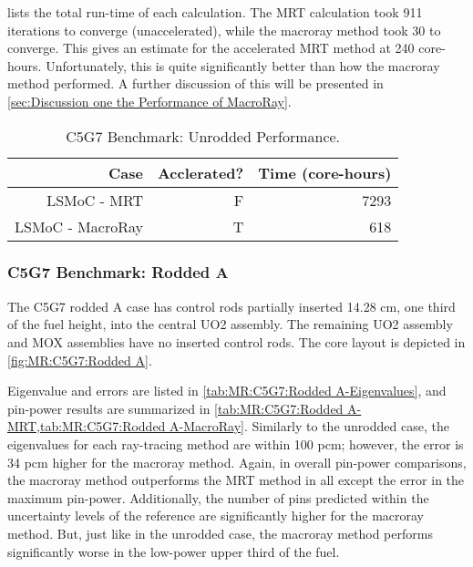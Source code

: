 {{{{         lists the total run-time of each calculation.
        The \ac{MRT} calculation took 911 iterations to converge (unaccelerated), while the macroray method took 30 to converge.
        This gives an estimate for the accelerated \ac{MRT} method at 240 core-hours.
        Unfortunately, this is quite significantly better than how the macroray method performed.
        A further discussion of this will be presented in \cref{sec:Discussion one the Performance of MacroRay}.

        \begin{table}[htbp]
          \centering
          \caption{C5G7 Benchmark: Unrodded Performance. \label{tab:MR:C5G7:Unrodded-Performance}}
          \begin{tabular}{rrr}\toprule
            Case                        & Acclerated? & Time (core-hours)\\\midrule
            LSMoC - MRT                 & F & 7293\\
            LSMoC - MacroRay            & T & 618\\\bottomrule
          \end{tabular}
        \end{table}
      }

      \subsubsection{C5G7 Benchmark: Rodded A}{\label{sssec:MR:C5G7:Rodded A}
        The C5G7 rodded A case has control rods partially inserted 14.28 cm, one third of the fuel height, into the central \ac{UO2} assembly.
        The remaining \ac{UO2} assembly and \ac{MOX} assemblies have no inserted control rods.
        The core layout is depicted in \cref{fig:MR:C5G7:Rodded A}.

        Eigenvalue and errors are listed in \cref{tab:MR:C5G7:Rodded A-Eigenvalues}, and pin-power results are summarized in \cref{tab:MR:C5G7:Rodded A-MRT,tab:MR:C5G7:Rodded A-MacroRay}.
        Similarly to the unrodded case, the eigenvalues for each ray-tracing method are within 100 pcm; however, the error is 34 pcm higher for the macroray method.
        Again, in overall pin-power comparisons, the macroray method outperforms the MRT method in all except the error in the maximum pin-power.
        Additionally, the number of pins predicted within the uncertainty levels of the reference are significantly higher for the macroray method.
        But, just like in the unrodded case, the macroray method performs significantly worse in the low-power upper third of the fuel.

}}}}
